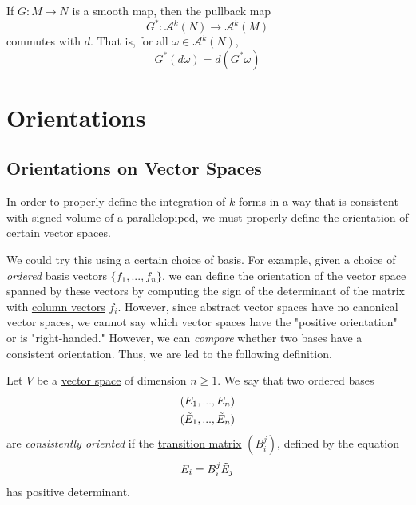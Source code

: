 \documentclass{article}
\newcounter{definition}[section]
\newcounter{example}[section]
\begin{document}
    \begin{lemma}
      \label{thm:naturality-of-the-exterior-derivative}
    If $G: M \to N$ is a smooth map, then the pullback map
    \begin{equation}
      G^* : \mathcal{A}^k (N) \to \mathcal{A}^k (M)
    \end{equation}
    commutes with $d$. That is, for all $\omega \in \mathcal{A}^k (N)$, 
    \begin{equation}
      G^*(d \omega) = d (G^* \omega)
    \end{equation}
    \end{lemma}

\section{Orientations}

  \subsection{Orientations on Vector Spaces}

    In order to properly define the integration of $k$-forms in a way that is consistent with signed volume of a parallelopiped, we must properly define the orientation of certain vector spaces. 

    We could try this using a certain choice of basis. For example, given a choice of \textit{ordered} basis vectors $\{f_1, ..., f_n\}$, we can define the orientation of the vector space spanned by these vectors by computing the sign of the determinant of the matrix with \hyperref[lin-def:column-vector]{column vectors} $f_i$. However, since abstract vector spaces have no canonical vector spaces, we cannot say which vector spaces have the "positive orientation" or is "right-handed." However, we can \textit{compare} whether two bases have a consistent orientation. Thus, we are led to the following definition. 

    \begin{definition}
      \label{def:consistently-oriented-bases}
    Let $V$ be a \hyperref[lin-def:vector-space]{vector space} of dimension $n \geq 1$. We say that two ordered bases 
    \begin{align*}
        & (E_1, ..., E_n) \\
        & (\Tilde{E}_1, ..., \Tilde{E}_n)
    \end{align*}
    are \textit{consistently oriented} if the \hyperref[sp-def:transition-matrix]{transition matrix} $(B^j_i)$, defined by the equation
    \begin{equation}
      E_i = B^j_i \Tilde{E}_j
    \end{equation}
    has positive determinant. 
    \end{definition}
\end{document}
